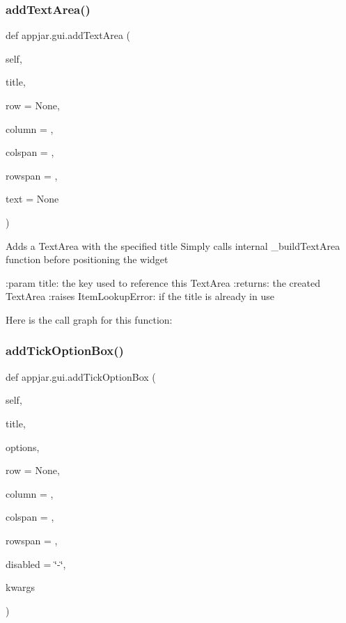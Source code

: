 \subsubsection{\texorpdfstring{add\+Text\+Area()}{addTextArea()}}
{\footnotesize\ttfamily def appjar.\+gui.\+add\+Text\+Area (\begin{DoxyParamCaption}\item[{}]{self,  }\item[{}]{title,  }\item[{}]{row = {\ttfamily None},  }\item[{}]{column = {},  }\item[{}]{colspan = {},  }\item[{}]{rowspan = {},  }\item[{}]{text = {\ttfamily None} }\end{DoxyParamCaption})}

\begin{DoxyVerb}Adds a TextArea with the specified title
Simply calls internal _buildTextArea function before positioning the widget

:param title: the key used to reference this TextArea
:returns: the created TextArea
:raises ItemLookupError: if the title is already in use
\end{DoxyVerb}
 Here is the call graph for this function\+:
\mbox{\label{classappjar_1_1gui_ab439d49f6c4be161345abf4fd11dd0c5}} 
\subsubsection{\texorpdfstring{add\+Tick\+Option\+Box()}{addTickOptionBox()}}
{\footnotesize\ttfamily def appjar.\+gui.\+add\+Tick\+Option\+Box (\begin{DoxyParamCaption}\item[{}]{self,  }\item[{}]{title,  }\item[{}]{options,  }\item[{}]{row = {\ttfamily None},  }\item[{}]{column = {},  }\item[{}]{colspan = {},  }\item[{}]{rowspan = {},  }\item[{}]{disabled = {\ttfamily \char`\"{}-\/\char`\"{}},  }\item[{}]{kwargs }\end{DoxyParamCaption})}

